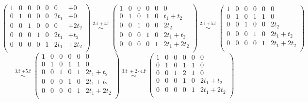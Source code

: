\documentclass[12pt]{article}
\begin{document}
\begin{enumerate}
    \[
      \left(\begin{array}{ccccc|cc}
        1 & 0 & 0 & 0 & 0 & 0 & +0 \\
        0 & 1 & 0 & 0 & 0 & 2t_1 & +0 \\
        0 & 0 & 1 & 0 & 0 & 0 & +2t_2 \\ \hline
        0 & 0 & 0 & 1 & 0 & 2t_1 & +t_2 \\
        0 & 0 & 0 & 0 & 1 & 2t_1 & +2t_2 \\
      \end{array}\right)
      \overset{\text{2.ř }+\text{4.ř}}{\;\sim\;}
      \left(\begin{array}{ccccc|c}
        1 & 0 & 0 & 0 & 0 & 0  \\
        0 & 1 & 0 & 1 & 0 & t_1+t_2 \\
        0 & 0 & 1 & 0 & 0 & 2t_2 \\ \hline
        0 & 0 & 0 & 1 & 0 & 2t_1+t_2 \\
        0 & 0 & 0 & 0 & 1 & 2t_1+2t_2 \\
      \end{array}\right)
      \overset{\text{2.ř }+\text{5.ř}}{\;\sim\;}
      \left(\begin{array}{ccccc|c}
        1 & 0 & 0 & 0 & 0 & 0  \\
        0 & 1 & 0 & 1 & 1 & 0 \\
        0 & 0 & 1 & 0 & 0 & 2t_2 \\ \hline
        0 & 0 & 0 & 1 & 0 & 2t_1+t_2 \\
        0 & 0 & 0 & 0 & 1 & 2t_1+2t_2 \\
      \end{array}\right)
    \]
    \[
      \overset{\text{3.ř }+\text{5.ř}}{\;\sim\;}
      \left(\begin{array}{ccccc|c}
        1 & 0 & 0 & 0 & 0 & 0  \\
        0 & 1 & 0 & 1 & 1 & 0 \\
        0 & 0 & 1 & 0 & 1 & 2t_1 + t_2 \\ \hline
        0 & 0 & 0 & 1 & 0 & 2t_1+t_2 \\
        0 & 0 & 0 & 0 & 1 & 2t_1+2t_2 \\
      \end{array}\right)
      \overset{\text{3.ř }+2\cdot\text{4.ř}}{\;\sim\;}
      \left(\begin{array}{ccccc|c}
        1 & 0 & 0 & 0 & 0 & 0  \\
        0 & 1 & 0 & 1 & 1 & 0 \\
        0 & 0 & 1 & 2 & 1 & 0 \\ \hline
        0 & 0 & 0 & 1 & 0 & 2t_1+t_2 \\
        0 & 0 & 0 & 0 & 1 & 2t_1+2t_2 \\
      \end{array}\right)
    \]


\end{enumerate}
\end{document}

